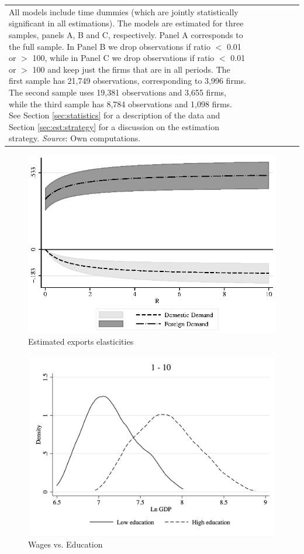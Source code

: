 \documentclass[a4paper,12pt]{article}
\begin{document}
\begin{table}[ht]
{\begin{tabular}{lcc|cc|cc}
{All models include time dummies (which are jointly statistically significant in all estimations).
The models are estimated for three samples, panels A, B and C, respectively. Panel A corresponds to the full sample. In Panel B we drop observations if ratio $<$ 0.01 or $>$ 100, while in Panel C we drop observations if ratio $<$ 0.01 or $>$ 100 and keep just the firms that are in all periods.
The first sample has 21,749 observations, corresponding to 3,996 firms. The second sample uses 19,381 observations and 3,655 firms, while the third sample has 8,784 observations and 1,098 firms.
See Section \ref{sec:statistics} for a description of the data and Section \ref{sec:est:strategy} for a discussion on the estimation strategy.
\textit{Source}: Own computations.}
\end{tabular}}
\end{table}


\begin{figure}[ht]
	\centering
	\includegraphics[width=0.7\linewidth]{figures/elasticities_estimated.eps}
	\caption{Estimated exports elasticities}
	\label{fig:elasticities:estimated}
\end{figure}


\begin{figure}[ht]
	\centering
	\includegraphics[width=0.7\linewidth]{figures/lnwage_education.png}
	\caption{Wages vs. Education}
	\label{fig:lnwage:education}
\end{figure}
\end{document}
